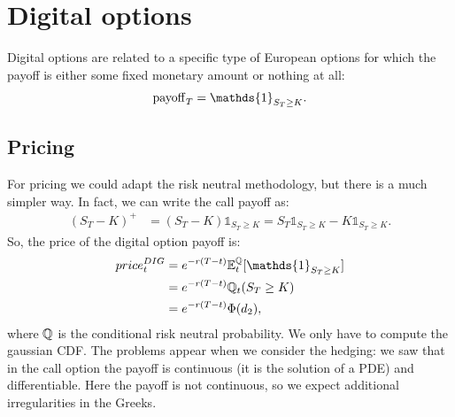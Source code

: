 \section{Digital options}
Digital options are related to a specific type of European options for which the payoff is either some fixed monetary amount or nothing at all:
\begin{equation}
    \pay_T = \mathds{1}_{S_T\ge K}.
\end{equation}

\subsection{Pricing}
For pricing we could adapt the risk neutral methodology, but there is a much simpler way. In fact, we can write the call payoff as:
\begin{align}
    (S_T-K)^+ &= (S_T-K)\mathds{1}_{S_T\ge K} = S_T\mathds{1}_{S_T\ge K} - K\mathds{1}_{S_T\ge K}.
\end{align}
So, the price of the digital option payoff is:
\begin{align}
    \notag price^{DIG}_t &= e^{-r(T-t)}\expect_t[\mathds{1}_{S_T\ge K}] \\
    &=
    \notag e^{-r(T-t)}\Qmeas_t(S_T\ge K) \\
    &=
    e^{-r(T-t)}\Phi(d_2),
\end{align}
where $\mathbb{Q}$ is the conditional risk neutral probability. We only have to compute the gaussian CDF. The problems appear when we consider the hedging: we saw that in the call option the payoff is continuous (it is the solution of a PDE) and differentiable. Here the payoff is not continuous, so we expect additional irregularities in the Greeks.

